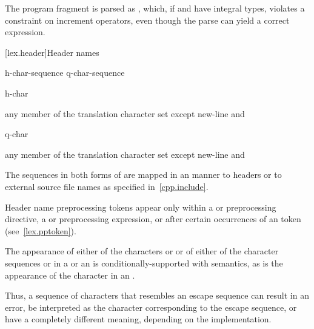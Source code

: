 \pnum
\begin{example}
The program fragment  is parsed as , which, if  and  have integral types,
violates a constraint on increment operators, even though the parse
 can yield a correct expression.
\end{example}

[lex.header]{Header names}

%
\begin{bnf}
\br
    \terminal{<} h-char-sequence \terminal{>}\br
     q-char-sequence 
\end{bnf}

\begin{bnf}
\br
    h-char 
\end{bnf}

\begin{bnf}
\br
    \textnormal{any member of the translation character set except new-line and }
\end{bnf}

\begin{bnf}
\br
    q-char 
\end{bnf}

\begin{bnf}
\br
    \textnormal{any member of the translation character set except new-line and }
\end{bnf}

\pnum
The sequences in both forms of  are mapped in an
 manner to headers or to
external source file names as specified in~\ref{cpp.include}.
\begin{note}
Header name preprocessing tokens appear only within
a  or  preprocessing directive,
a  or  preprocessing expression, or
after certain occurrences of an  token
(see~\ref{lex.pptoken}).
\end{note}

\pnum
The appearance of either of the characters  or \tcode{\textbackslash} or of
either of the character sequences \tcode{/*} or \tcode{//} in a
 or an 
is conditionally-supported with  semantics, as is the appearance of the character
 in an .
\begin{note}
Thus, a sequence of characters
that resembles an escape sequence can result in an error, be interpreted as the
character corresponding to the escape sequence, or have a completely different meaning,
depending on the implementation.
\end{note}


